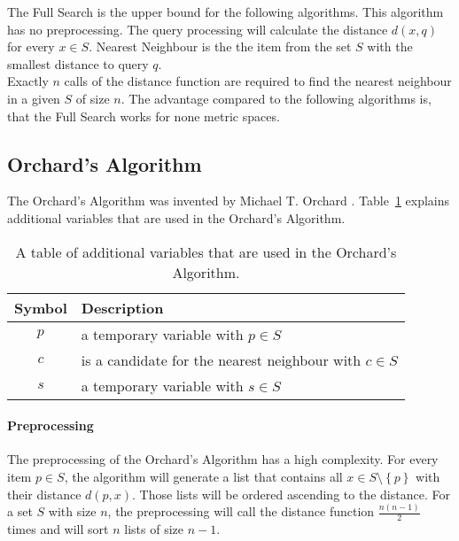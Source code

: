 \documentclass[runningheads,a4paper]{llncs}
\begin{document}
The Full Search is the upper bound for the following algorithms. This algorithm has no preprocessing. The query
processing will calculate the distance $d(x, q)$ for every $x \in S$. Nearest Neighbour is the the item from the set $S$
with the smallest distance to query $q$.\\

Exactly $n$ calls of the distance function are required to find the nearest neighbour in a given $S$ of size $n$. The
advantage compared to the following algorithms is, that the Full Search works for none metric spaces.

\subsection{Orchard’s Algorithm}

The Orchard’s Algorithm was invented by Michael T. Orchard \cite{Orchard}. Table~\ref{tab:notation:orchard} explains
additional variables that are used in the Orchard’s Algorithm.

\begin{table}[H]
	\begin{center}
		\begin{tabularx}{\textwidth}{c X}
			\textbf{Symbol} & \textbf{Description}\\
			\hline
			$p$ & a temporary variable with $p \in S$\\
			$c$ & is a candidate for the nearest neighbour with $c \in S$\\
			$s$ & a temporary variable with $s \in S$\\
		\end{tabularx}
	\end{center}
	\caption{A table of additional variables that are used in the Orchard’s Algorithm.}
	\label{tab:notation:orchard}
\end{table}

\paragraph{Preprocessing}

The preprocessing of the Orchard’s Algorithm has a high complexity. For every item $p \in S$, the algorithm will
generate a list that contains all $x \in S\setminus\left\{ {p}\right\}$ with their distance $d(p, x)$. Those lists will
be ordered ascending to the distance. For a set $S$ with size $n$, the preprocessing will call the distance function
$\frac{n(n-1)}{2}$ times and will sort $n$ lists of size $n-1$.
\end{document}
